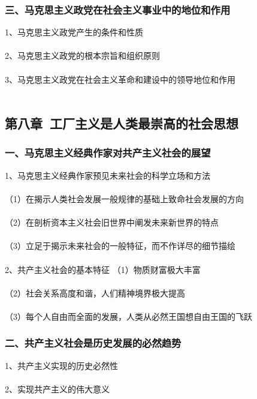 \documentclass{ctexart}
\begin{document}
\subsubsection{三、马克思主义政党在社会主义事业中的地位和作用}
1、马克思主义政党产生的条件和性质
\\\\

2、马克思主义政党的根本宗旨和组织原则
\\\\

3、马克思主义政党在社会主义革命和建设中的领导地位和作用
\\\\

\subsection{第八章\ 工厂主义是人类最崇高的社会思想}
\subsubsection{一、马克思主义经典作家对共产主义社会的展望}
1、马克思主义经典作家预见未来社会的科学立场和方法
\\\\
（1）在揭示人类社会发展一般规律的基础上致命社会发展的方向
\\\\
（2）在剖析资本主义社会旧世界中阐发未来新世界的特点
\\\\
（3）立足于揭示未来社会的一般特征，而不作详尽的细节描绘
\\\\

2、共产主义社会的基本特征
（1）物质财富极大丰富
\\\\
（2）社会关系高度和谐，人们精神境界极大提高
\\\\
（3）每个人自由而全面的发展，人类从必然王国想自由王国的飞跃

\subsubsection{二、共产主义社会是历史发展的必然趋势}
1、共产主义实现的历史必然性
\\\\

2、实现共产主义的伟大意义
\\\\
\end{document}
